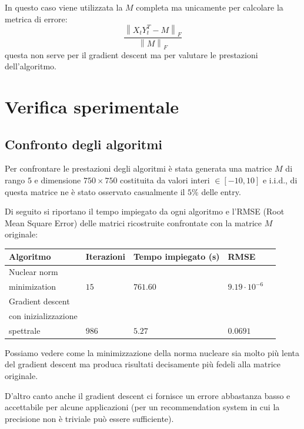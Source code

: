 \documentclass[12pt,a4paper]{report}
\newcommand{\frobnorm}[1]{\left\lVert#1\right\rVert _F}
\begin{document}
\newpage

In questo caso viene utilizzata la $M$ completa ma unicamente per
calcolare la metrica di errore:
$$\frac{\frobnorm{X_t Y_t^T - M}}{\frobnorm{M}}$$
questa non serve per il gradient descent
ma per valutare le prestazioni dell'algoritmo.

\chapter{Verifica sperimentale}

\section{Confronto degli algoritmi}

Per confrontare le prestazioni degli algoritmi è stata generata una matrice
$M$ di rango $5$ e dimensione $750 \times 750$ costituita da valori
interi $\in [-10,10]$ e i.i.d., di questa matrice ne è stato
osservato casualmente il $5\%$ delle entry.

Di seguito si riportano il tempo impiegato
da ogni algoritmo e l'RMSE (Root Mean Square Error)
delle matrici ricostruite confrontate con la matrice $M$ originale:

\begin{table}[H]
  \centering
  \begin{tabular}{@{}lllll@{}}
  \toprule
  \textbf{Algoritmo} & \textbf{Iterazioni} & \textbf{Tempo impiegato (s)} & \textbf{RMSE} \\ \midrule
  Nuclear norm\\ minimization                         & $15$  & $761.60$ & $9.19\cdot 10^{-6}$ \\ \midrule
  Gradient descent\\ con inizializzazione\\ spettrale & $986$ & $5.27$   & $0.0691$             \\ \bottomrule
  \end{tabular}
\end{table}
Possiamo vedere come la minimizzazione della norma nucleare
sia molto più lenta del gradient descent ma produca risultati decisamente più
fedeli alla matrice originale.

D'altro canto anche il gradient descent ci 
fornisce un errore abbastanza basso e accettabile per alcune applicazioni
(per un recommendation system in cui la precisione
non è triviale può essere sufficiente).

\newpage
\end{document}
